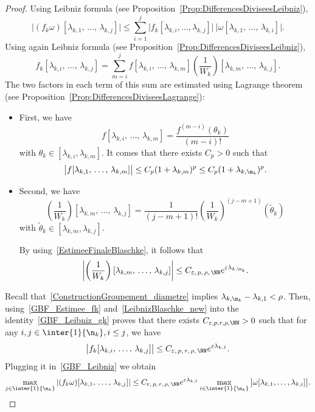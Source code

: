 \begin{proof}
Using Leibniz formula (see Proposition~\ref{Prop:DifferencesDiviseesLeibniz}),
\begin{equation}\label{GBF_Leibniz}
\big| (f_k \omega) [\lambda_{k,1},\,\dots,\, \lambda_{k,j}] \big|
\leq \sum_{i=1}^j \big| f_k[\lambda_{k,i},\dots,\lambda_{k,j}] \big| \: \big| \omega[\lambda_{k,1},\,\dots,\,\lambda_{k,i}] \big|.
\end{equation}
Using again Leibniz formula (see Proposition~\ref{Prop:DifferencesDiviseesLeibniz}),
\begin{equation}\label{GBF_Leibniz_gk}
f_k[\lambda_{k,i},\,\dots,\,\lambda_{k,j}] = \sum_{m=i}^j f[\lambda_{k,i},\,\dots,\,\lambda_{k,m}] \left(\frac{1}{W_k} \right)[\lambda_{k,m},\,\dots,\,\lambda_{k,j}].
\end{equation}
The two factors in each term of this sum are estimated using Lagrange theorem (see Proposition~\ref{Prop:DifferencesDiviseesLagrange}):
\begin{itemize}
\item First, we have
\[
f[\lambda_{k,i},\,\dots,\,\lambda_{k,m}] = \frac{f^{(m-i)}(\theta_k)}{(m-i)!}
\]
with $\theta_k \in [\lambda_{k,i}, \lambda_{k,m}]$. It comes that there exists $C_p>0$ such that
\begin{equation}\label{GBF_Estimee_fk}
\big| f[\lambda_{k,1},\,\dots,\,\lambda_{k,m}] \big| \leq C_p (1+\lambda_{k,m})^p \leq C_p (1+\lambda_{k,\n_k})^p.
\end{equation}
\item Second, we have
\begin{equation*}
\left(\frac{1}{W_k} \right)[\lambda_{k,m},\, \dots,\,\lambda_{k,j}] = \frac{1}{(j-m+1)!} \left(\frac{1}{W_k} \right)^{(j-m+1)}(\tilde{\theta}_k)
\end{equation*}
with $\tilde{\theta}_k \in [\lambda_{k,m},\lambda_{k,j}]$.


By using~\eqref{EstimeeFinaleBlaschke}, it follows that
\begin{equation}\label{LeibnizBlaschke_new}
\left|\left(\frac{1}{W_k} \right)[\lambda_{k,m},\,\dots,\,\lambda_{k,j}]\right| \leq C_{\varepsilon,\,p,\, \rho,\, \NN} e^{\varepsilon \lambda_{k,\n_k}}.
\end{equation}
\end{itemize}


Recall that~\eqref{ConstructionGroupement_diametre} implies $\lambda_{k,\n_k} - \lambda_{k,1} < \rho$. Then, using~\eqref{GBF_Estimee_fk} and~\eqref{LeibnizBlaschke_new} into the identity~\eqref{GBF_Leibniz_gk} proves that there exists $C_{\varepsilon, p, r, \rho, \NN}>0$ such that for any $i,j\in \inter{1}{\n_k}, i\leq j$, we have
\[
\big| f_k[\lambda_{k,i},\,\dots,\, \lambda_{k,j}] \big| \leq C_{\varepsilon,\, p,\, r,\, \rho,\, \NN} e^{\varepsilon \lambda_{k,1}}.
\]
Plugging it in~\eqref{GBF_Leibniz} we obtain
\[
\max_{j\in \inter{1}{\n_k}} \left| (f_k \omega) [\lambda_{k,1},\,\dots,\, \lambda_{k,j}] \right| \leq C_{\varepsilon,\, p,\, r,\, \rho,\, \NN} e^{\varepsilon \lambda_{k,1}} \max \limits_{i\in \inter{1}{\n_k}} \big| \omega[\lambda_{k,1}, \dots, \lambda_{k,i}] \big|.
\]


\end{proof}
